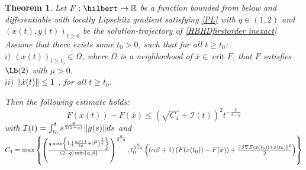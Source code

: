 \documentclass[reqno]{amsart}
\theoremstyle{plain}
\newtheorem{theorem}{Theorem}	%
\theoremstyle{definition}
\theoremstyle{remark}
\newcommand{\R}{\mathbb{R}}	%
\DeclareMathOperator{\crit}{crit}	%
\DeclarePairedDelimiter{\norm}{\lVert}{\rVert}	%
\newcommand{\Ib}{\mathcal{I}}
\begin{document}
\begin{theorem}\label{basicteorates firstorder q}
Let $F:\hilbert\to\R$ be a function bounded from below and differentiable with locally Lipschitz gradient satisfying \ref{PL} with $q\in(1,2)$ and $\left(x(t),y(t)\right)_{t\geq0}$ be the solution-trajectory of \eqref{HBHDfirstorder inexact} Assume that there exists some $t_{0}>0$, such that for all $t\geq t_{0}$:\\
$i)$  $\left(x(t)\right)_{t\geq t_{0}} \in \Omega$, where $\Omega$ is a neighborhood of $\bar{x}\in\crit{F}$, that $F$ satisfies $\Lb(2)$ with $\mu>0$.\\
$ii)$ $\norm{\dot{x}(t)} \leq 1$ , for all $t\geq t_{0}$.
	
Then the following estimate holds:
\begin{equation}\label{rate on alphabetaq first}
	F(x(t))-F(\bar{x}) \leq  \left(\sqrt{C_{4}} + \Ib(t)\right)^{2}t^{-\frac{q}{2-q}}
\end{equation}
with $\Ib(t)=\int_{t_{0}}^{t}s^{\frac{q}{2(2-q)}}\norm{g(s)}ds$ and\\ $C_{4} = \max\left\{\left(\frac{q\max\left\{1,\left(\frac{\alpha\beta+1}{2\mu}+\beta^{2}\right)^{\frac{2}{q}}\right\}}{(2-q)\min\{\alpha,\beta\}}\right)^{\frac{q}{2-q}} , t_{0}^{\frac{q}{2-q}}\left((\alpha\beta+1)\left(F(x(t_{0}))-F(\bar{x})\right) +\frac{\norm{\beta\nabla F(x(t_{0}))+\dot{x}(t_{0})}^{2}}{2}\right)\right\}$
\end{theorem}
\end{document}
